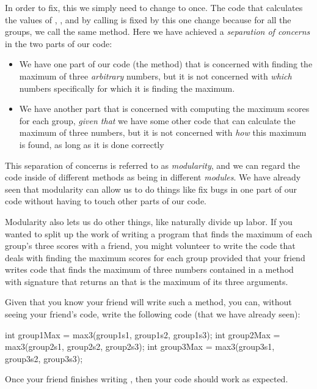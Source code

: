 In order to fix, this we simply need to change 
to  once. The code that calculates
the values of , ,
and  by calling  is fixed by this
one change because for all the groups, we call the
same method. Here we have achieved a \emph{separation of concerns}
in the two parts of our code:
\begin{itemize}
\item We have one part of our code (the  method)
that is concerned with finding the maximum of three \emph{arbitrary}
numbers, but it is not concerned with \emph{which} numbers
specifically for which it is finding the maximum.
\item We have another part that
is concerned with computing the maximum scores for each group,
\emph{given that} we have some other code that
can calculate the maximum of three numbers, but it is
not concerned with \emph{how} this maximum is found,
as long as it is done correctly
\end{itemize}

This separation of concerns is referred to as \emph{modularity},
and we can regard the code inside of different methods as
being in different \emph{modules}.
We have already seen that modularity can allow us to do
things like fix bugs in one part of our code without having
to touch other parts of our code.

Modularity also lets us do other things, like naturally
divide up labor. If you wanted to split up the work
of writing a program that finds the maximum of each
group's three scores with a friend,
you might volunteer to write the code that deals with
finding the maximum scores for each group provided that
your friend writes code that finds the maximum of three numbers
contained in a method with signature  that returns
an  that is the maximum of its three  arguments.

Given that you know your friend will write such a 
method, you can, without seeing your friend's code,
write the following code (that we have already seen):
\begin{code}
int group1Max = max3(group1s1, group1s2, group1s3);
int group2Max = max3(group2s1, group2s2, group2s3);
int group3Max = max3(group3s1, group3s2, group3s3);
\end{code}

\noindent Once your friend finishes writing , then your code
should work as expected. 

